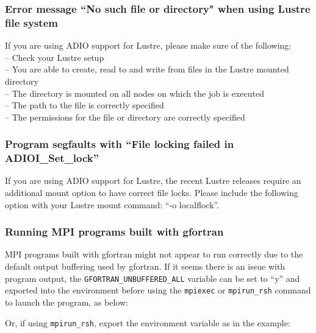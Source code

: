 \subsubsection{Error message ``No such file or directory" when using Lustre file system}
   If you are using ADIO support for Lustre, please make sure of the
   following:\\
   {-- Check your Lustre setup}\\
   {-- You are able to create,
	read to and write from files in the Lustre mounted directory}\\
   {-- The directory is mounted on all nodes on which the job is
   executed}\\
    {-- The path to the file is correctly specified}\\
    {-- The permissions for the file or directory are correctly specified}
    
\subsubsection{Program segfaults with ``File locking failed in ADIOI\_Set\_lock''}
If you are using ADIO support for Lustre, the recent Lustre releases
require an additional mount option to have correct file locks.
Please include the following option with your Lustre mount command: ``-o
localflock''.\\


\subsubsection{Running MPI programs built with gfortran}

MPI programs built with gfortran might not appear to run correctly due
to the default output buffering used by gfortran.  If it seems there is
an issue with program output, the \texttt{GFORTRAN\_UNBUFFERED\_ALL}
variable can be set to ``y'' and exported into the environment before
using the \texttt{mpiexec} or \texttt{mpirun\_rsh} command to launch the
program, as below:\\


Or, if using {\tt mpirun\_rsh}, export the environment variable as in the
example:


